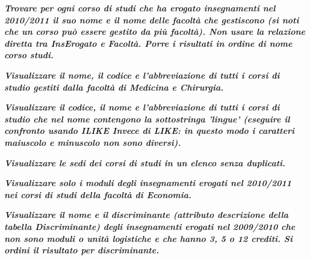 \documentclass[a4paper]{article}
\begin{document}
	\noindent
	\textcolor{Green4}{\textbf{\emph{Trovare per ogni corso di studi che ha erogato insegnamenti nel 2010/2011 il suo nome e il nome delle facoltà che gestiscono (si noti che un corso può essere gestito da più facoltà). Non usare la relazione diretta tra InsErogato e Facoltà. Porre i risultati in ordine di nome corso studi.}}}\newline
	
	\noindent
	\:\newline

	\noindent
	\textcolor{Green4}{\textbf{\emph{Visualizzare il nome, il codice e l'abbreviazione di tutti i corsi di studio gestiti dalla facoltà di Medicina e Chirurgia.}}}\newline
	
	\noindent
	\:\newline

	\noindent
	\textcolor{Green4}{\textbf{\emph{Visualizzare il codice, il nome e l'abbreviazione di tutti i corsi di studio che nel nome contengono la sottostringa 'lingue' (eseguire il confronto usando ILIKE Invece di LIKE: in questo modo i caratteri maiuscolo e minuscolo non sono diversi).}}}\newline
	
	\noindent
	\:\newline

	\noindent
	\textcolor{Green4}{\textbf{\emph{Visualizzare le sedi dei corsi di studi in un elenco senza duplicati.}}}\newline
	
	\noindent
	\:\newline

	\noindent
	\textcolor{Green4}{\textbf{\emph{Visualizzare solo i moduli degli insegnamenti erogati nel 2010/2011 nei corsi di studi della facoltà di Economia.}}}\newline
	
	\noindent
	\:\newline

	\noindent
	\textcolor{Green4}{\textbf{\emph{Visualizzare il nome e il discriminante (attributo descrizione della tabella Discriminante) degli insegnamenti erogati nel 2009/2010 che non sono moduli o unità logistiche e che hanno 3, 5 o 12 crediti. Si ordini il risultato per discriminante.}}}\newline
	
\end{document}
